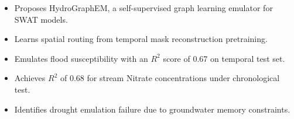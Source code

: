 \begin{itemize}
  \item Proposes HydroGraphEM, a self-supervised graph learning emulator for SWAT models.
  \item Learns spatial routing from temporal mask reconstruction pretraining.
  \item Emulates flood susceptibility with an $R^2$ score of 0.67 on temporal test set.
  \item Achieves $R^2$ of 0.68 for stream Nitrate concentrations under chronological test.
  \item Identifies drought emulation failure due to groundwater memory constraints.
\end{itemize}
